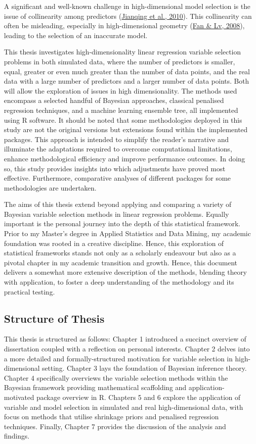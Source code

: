 \documentclass[
  11pt,
]{article}
\begin{document}
A significant and well-known challenge in high-dimensional model
selection is the issue of collinearity among predictors
(\protect\hyperlink{ref-Jianqing2010}{Jianqing et al., 2010}). This
collinearity can often be misleading, especially in high-dimensional
geometry (\protect\hyperlink{ref-Fan2008}{Fan \& Lv, 2008}), leading to
the selection of an inaccurate model.

This thesis investigates high-dimensionality linear regression variable
selection problems in both simulated data, where the number of
predictors is smaller, equal, greater or even much greater than the
number of data points, and the real data with a large number of
predictors and a larger number of data points. Both will allow the
exploration of issues in high dimensionality. The methods used encompass
a selected handful of Bayesian approaches, classical penalised
regression techniques, and a machine learning ensemble tree, all
implemented using R software. It should be noted that some methodologies
deployed in this study are not the original versions but extensions
found within the implemented packages. This approach is intended to
simplify the reader's narrative and illuminate the adaptations required
to overcome computational limitations, enhance methodological efficiency
and improve performance outcomes. In doing so, this study provides
insights into which adjustments have proved most effective. Furthermore,
comparative analyses of different packages for some methodologies are
undertaken.

The aims of this thesis extend beyond applying and comparing a variety
of Bayesian variable selection methods in linear regression problems.
Equally important is the personal journey into the depth of this
statistical framework. Prior to my Master's degree in Applied Statistics
and Data Mining, my academic foundation was rooted in a creative
discipline. Hence, this exploration of statistical frameworks stands not
only as a scholarly endeavour but also as a pivotal chapter in my
academic transition and growth. Hence, this document delivers a somewhat
more extensive description of the methods, blending theory with
application, to foster a deep understanding of the methodology and its
practical testing.

\subsection{Structure of Thesis}

This thesis is structured as follows: Chapter 1 introduced a succinct
overview of dissertation coupled with a reflection on personal
interests. Chapter 2 delves into a more detailed and formally-structured
motivation for variable selection in high-dimensional setting. Chapter 3
lays the foundation of Bayesian inference theory. Chapter 4 specifically
overviews the variable selection methods within the Bayesian framework
providing mathematical scaffolding and application-motivated package
overview in R. Chapters 5 and 6 explore the application of variable and
model selection in simulated and real high-dimensional data, with focus
on methods that utilise shrinkage priors and penalised regression
techniques. Finally, Chapter 7 provides the discussion of the analysis
and findings.
\end{document}
